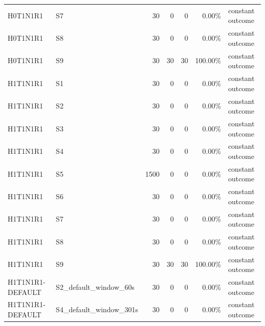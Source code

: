 \begin{tabular}{llrrrrl}
H0T1N1R1 & S7 & 30 & 0 & 0 & 0.00\% & constant outcome \\
H0T1N1R1 & S8 & 30 & 0 & 0 & 0.00\% & constant outcome \\
H0T1N1R1 & S9 & 30 & 30 & 30 & 100.00\% & constant outcome \\
H1T1N1R1 & S1 & 30 & 0 & 0 & 0.00\% & constant outcome \\
H1T1N1R1 & S2 & 30 & 0 & 0 & 0.00\% & constant outcome \\
H1T1N1R1 & S3 & 30 & 0 & 0 & 0.00\% & constant outcome \\
H1T1N1R1 & S4 & 30 & 0 & 0 & 0.00\% & constant outcome \\
H1T1N1R1 & S5 & 1500 & 0 & 0 & 0.00\% & constant outcome \\
H1T1N1R1 & S6 & 30 & 0 & 0 & 0.00\% & constant outcome \\
H1T1N1R1 & S7 & 30 & 0 & 0 & 0.00\% & constant outcome \\
H1T1N1R1 & S8 & 30 & 0 & 0 & 0.00\% & constant outcome \\
H1T1N1R1 & S9 & 30 & 30 & 30 & 100.00\% & constant outcome \\
H1T1N1R1-DEFAULT & S2_default_window_60s & 30 & 0 & 0 & 0.00\% & constant outcome \\
H1T1N1R1-DEFAULT & S4_default_window_301s & 30 & 0 & 0 & 0.00\% & constant outcome \\
\bottomrule
\end{tabular}
